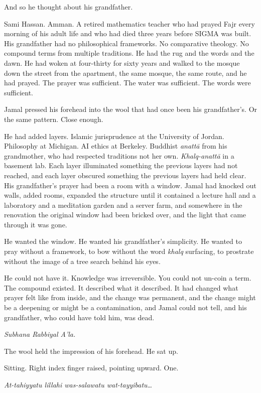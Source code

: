 And so he thought about his grandfather.

Sami Hassan. Amman. A retired mathematics teacher who had prayed Fajr every morning of his adult life and who had died three years before SIGMA was built. His grandfather had no philosophical frameworks. No comparative theology. No compound terms from multiple traditions. He had the rug and the words and the dawn. He had woken at four-thirty for sixty years and walked to the mosque down the street from the apartment, the same mosque, the same route, and he had prayed. The prayer was sufficient. The water was sufficient. The words were sufficient.

Jamal pressed his forehead into the wool that had once been his grandfather's. Or the same pattern. Close enough.

He had added layers. Islamic jurisprudence at the University of Jordan. Philosophy at Michigan. AI ethics at Berkeley. Buddhist \emph{anatt\=a} from his grandmother, who had respected traditions not her own. \emph{Khalq-anatt\=a} in a basement lab. Each layer illuminated something the previous layers had not reached, and each layer obscured something the previous layers had held clear. His grandfather's prayer had been a room with a window. Jamal had knocked out walls, added rooms, expanded the structure until it contained a lecture hall and a laboratory and a meditation garden and a server farm, and somewhere in the renovation the original window had been bricked over, and the light that came through it was gone.

He wanted the window. He wanted his grandfather's simplicity. He wanted to pray without a framework, to bow without the word \emph{khalq} surfacing, to prostrate without the image of a tree search behind his eyes.

He could not have it. Knowledge was irreversible. You could not un-coin a term. The compound existed. It described what it described. It had changed what prayer felt like from inside, and the change was permanent, and the change might be a deepening or might be a contamination, and Jamal could not tell, and his grandfather, who could have told him, was dead.

\emph{Subhana Rabbiyal A'la.}

The wool held the impression of his forehead. He sat up.


Sitting. Right index finger raised, pointing upward. One.

\emph{At-tahiyyatu lillahi was-salawatu wat-tayyibatu\ldots{}}

